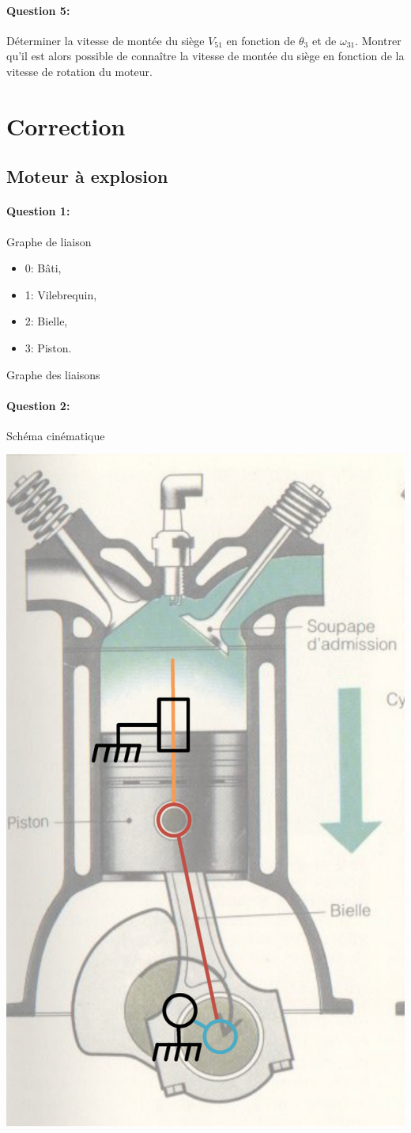 \paragraph{Question 5:} Déterminer la vitesse de montée du siège $V_{51}$ en fonction de $\theta_3$ et de $\omega_{31}$. Montrer qu'il est alors possible de connaître la vitesse de montée du siège en fonction de la vitesse de rotation du moteur.

\clearpage

\ifdef{\public}{}

\pagestyle{correction}

\section{Correction}

\subsection{Moteur à explosion}

\paragraph{Question 1:} Graphe de liaison

\begin{minipage}{0.4\linewidth}
  \begin{itemize}
    \item 0: Bâti,
    \item 1: Vilebrequin,
    \item 2: Bielle,
    \item 3: Piston.
  \end{itemize}
\end{minipage}
\hfill
\begin{minipage}{0.4\linewidth}
 Graphe des liaisons
\end{minipage}

\paragraph{Question 2:} Schéma cinématique

\begin{center}
	\includegraphics[width=0.35\linewidth]{img/moteur_cin}
\end{center}


